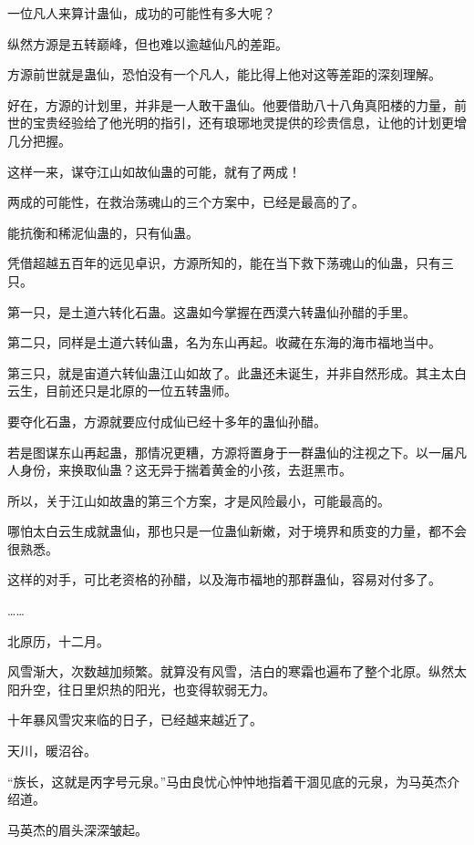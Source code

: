 
\begin{this_body}

一位凡人来算计蛊仙，成功的可能性有多大呢？

纵然方源是五转巅峰，但也难以逾越仙凡的差距。

方源前世就是蛊仙，恐怕没有一个凡人，能比得上他对这等差距的深刻理解。

好在，方源的计划里，并非是一人敢干蛊仙。他要借助八十八角真阳楼的力量，前世的宝贵经验给了他光明的指引，还有琅琊地灵提供的珍贵信息，让他的计划更增几分把握。

这样一来，谋夺江山如故仙蛊的可能，就有了两成！

两成的可能性，在救治荡魂山的三个方案中，已经是最高的了。

能抗衡和稀泥仙蛊的，只有仙蛊。

凭借超越五百年的远见卓识，方源所知的，能在当下救下荡魂山的仙蛊，只有三只。

第一只，是土道六转化石蛊。这蛊如今掌握在西漠六转蛊仙孙醋的手里。

第二只，同样是土道六转仙蛊，名为东山再起。收藏在东海的海市福地当中。

第三只，就是宙道六转仙蛊江山如故了。此蛊还未诞生，并非自然形成。其主太白云生，目前还只是北原的一位五转蛊师。

要夺化石蛊，方源就要应付成仙已经十多年的蛊仙孙醋。

若是图谋东山再起蛊，那情况更糟，方源将置身于一群蛊仙的注视之下。以一届凡人身份，来换取仙蛊？这无异于揣着黄金的小孩，去逛黑市。

所以，关于江山如故蛊的第三个方案，才是风险最小，可能最高的。

哪怕太白云生成就蛊仙，那也只是一位蛊仙新嫩，对于境界和质变的力量，都不会很熟悉。

这样的对手，可比老资格的孙醋，以及海市福地的那群蛊仙，容易对付多了。

……

北原历，十二月。

风雪渐大，次数越加频繁。就算没有风雪，洁白的寒霜也遍布了整个北原。纵然太阳升空，往日里炽热的阳光，也变得软弱无力。

十年暴风雪灾来临的日子，已经越来越近了。

天川，暖沼谷。

“族长，这就是丙字号元泉。”马由良忧心忡忡地指着干涸见底的元泉，为马英杰介绍道。

马英杰的眉头深深皱起。


\end{this_body}
